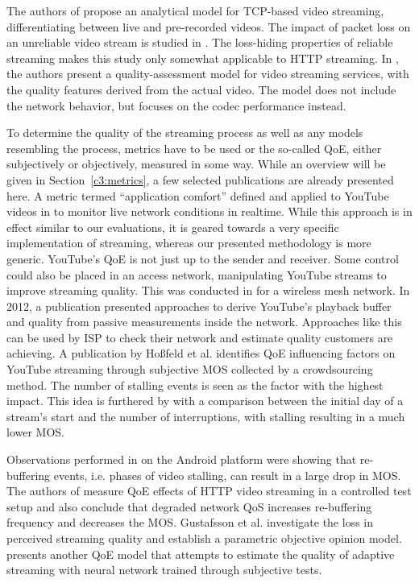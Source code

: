 The authors of \cite{wang2003model} propose an analytical model for TCP-based video streaming, differentiating between live and pre-recorded videos. The impact of packet loss on an unreliable video stream is studied in \cite{pv2010loss}. The loss-hiding properties of reliable streaming makes this study only somewhat applicable to \gls{HTTP} streaming. In \cite{pv2010qoe}, the authors present a quality-assessment model for video streaming services, with the quality features derived from the actual video. The model does not include the network behavior, but focuses on the codec performance instead. 

To determine the quality of the streaming process as well as any models resembling the process, metrics have to be used or the so-called \gls{QoE}, either subjectively or objectively, measured in some way. While an overview will be given in Section~\ref{c3:metrics}, a few selected publications are already presented here. A metric termed ``application comfort'' defined and applied to YouTube videos in \cite{staehle2010yomo} to monitor live network conditions in realtime. While this approach is in effect similar to our evaluations, it is geared towards a very specific implementation of streaming, whereas our presented methodology is more generic. YouTube's \gls{QoE} is not just up to the sender and receiver. Some control could also be placed in an access network, manipulating YouTube streams to improve streaming quality. This was conducted in \cite{5733220} for a wireless mesh network.
In 2012, a publication \cite{6296879} presented approaches to derive YouTube's playback buffer and quality from passive measurements inside the network. Approaches like this can be used by \gls{ISP} to check their network and estimate quality customers are achieving. A publication by Hoßfeld et al. \cite{6123395} identifies \gls{QoE} influencing factors on YouTube streaming through subjective \gls{MOS} collected by a crowdsourcing method. The number of stalling events is seen as the factor with the highest impact. This idea is furthered by \cite{6263849} with a comparison between the initial day of a stream's start and the number of interruptions, with stalling resulting in a much lower \gls{MOS}.

Observations performed in \cite{ketyko2010qoe} on the Android platform were showing that re-buffering events, i.e. phases of video stalling, can result in a large drop in \gls{MOS}. The authors of \cite{mokmeasuring} measure \gls{QoE} effects of \gls{HTTP} video streaming in a controlled test setup and also conclude that degraded network \gls{QoS} increases re-buffering frequency and decreases the \gls{MOS}. Gustafsson et al. \cite{gustafsson2008measuring} investigate the loss in perceived streaming quality and establish a parametric objective opinion model.
\cite{6181070} presents another \gls{QoE} model that attempts to estimate the quality of adaptive streaming with neural network trained through subjective tests.

